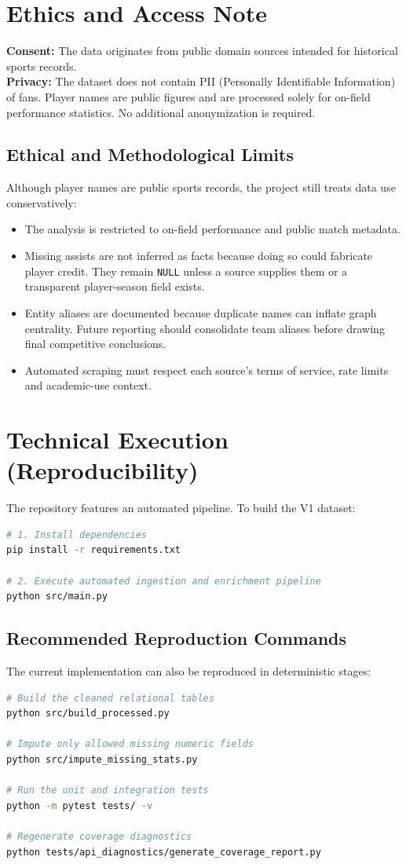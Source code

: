 \documentclass[12pt,a4paper]{article}
\begin{document}
\section{Ethics and Access Note}
\textbf{Consent:} The data originates from public domain sources intended for historical sports records. \\
\textbf{Privacy:} The dataset does not contain PII (Personally Identifiable Information) of fans. Player names are public figures and are processed solely for on-field performance statistics. No additional anonymization is required.

\subsection{Ethical and Methodological Limits}
Although player names are public sports records, the project still treats data use conservatively:
\begin{itemize}
    \item The analysis is restricted to on-field performance and public match metadata.
    \item Missing assists are not inferred as facts because doing so could fabricate player credit. They remain \texttt{NULL} unless a source supplies them or a transparent player-season field exists.
    \item Entity aliases are documented because duplicate names can inflate graph centrality. Future reporting should consolidate team aliases before drawing final competitive conclusions.
    \item Automated scraping must respect each source's terms of service, rate limits and academic-use context.
\end{itemize}

\section{Technical Execution (Reproducibility)}
The repository features an automated pipeline. To build the V1 dataset:
\begin{lstlisting}[language=bash]
# 1. Install dependencies
pip install -r requirements.txt

# 2. Execute automated ingestion and enrichment pipeline
python src/main.py
\end{lstlisting}

\subsection{Recommended Reproduction Commands}
The current implementation can also be reproduced in deterministic stages:
\begin{lstlisting}[language=bash]
# Build the cleaned relational tables
python src/build_processed.py

# Impute only allowed missing numeric fields
python src/impute_missing_stats.py

# Run the unit and integration tests
python -m pytest tests/ -v

# Regenerate coverage diagnostics
python tests/api_diagnostics/generate_coverage_report.py
\end{lstlisting}
\end{document}
